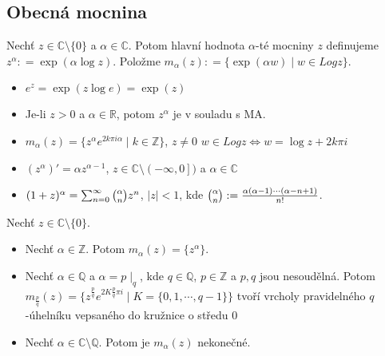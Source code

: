 \subsection{Obecná mocnina}

\begin{definition}
Nechť $z \in\mathbb{C}\setminus\{0\}$ a  $\alpha\in\mathbb{C}$. Potom hlavní hodnota $\alpha$-té mocniny $z$ definujeme $z^{\alpha}\colon=\exp(\alpha \log z)$. Položme $m_{\alpha}(z)\colon=\{\exp(\alpha w)\mid w\in Log z\}$. 
\end{definition}

\begin{properties}
\begin{itemize}
    \item $e^z=\exp(z \log e)=\exp(z)$ 
    \item Je-li $z>0$ a $\alpha\in\mathbb{R}$, potom $z^{\alpha}$ je v souladu s MA.
    \item $m_{\alpha}(z)=\{z^{\alpha}e^{2k\pi i \alpha}\mid k\in\mathbb{Z}\}$, $z\neq 0$
    \newline
    $w\in Log z\iff w=\log z +2k\pi i$
    \item $(z^{\alpha})'=\alpha z^{\alpha-1}$, $z\in\mathbb{C}\setminus\left (-\infty,0\right ])$ a $\alpha\in\mathbb{C}$
    \item $(1+z)^{\alpha}=\sum_{n=0}^{\infty}\tbinom{\alpha}{n}z^{n} $, $\lvert z \rvert<1$, kde $\tbinom{\alpha}{n}:=\frac{\alpha(\alpha-1)\cdots(\alpha-n+1)}{n!}$.
\end{itemize}
\end{properties}

\begin{example}
Nechť $z \in\mathbb{C}\setminus\{0\}$.
\begin{itemize}
    \item Nechť $\alpha\in\mathbb{Z}$. Potom $m_{\alpha}(z)=\{z^{\alpha}\}$.
    \item Nechť $\alpha\in\mathbb{Q}$ a $\alpha=p\mid_q$, kde $q\in\mathbb{Q}$, $p\in\mathbb{Z}$ a $p,q$ jsou nesoudělná. Potom $m_{\frac{p}{q}}(z)=\{z^{\frac{p}{q}}e^{2K\frac{p}{q}\pi i}\mid K=\{0,1,\cdots,q-1\}\}$
    tvoří vrcholy pravidelného $q$-úhelníku vepsaného do kružnice o středu $0$
    \item Nechť $\alpha\in\mathbb{C}\setminus\mathbb{Q}$. Potom je $m_{\alpha}(z)$ nekonečné.
\end{itemize}
\end{example}


